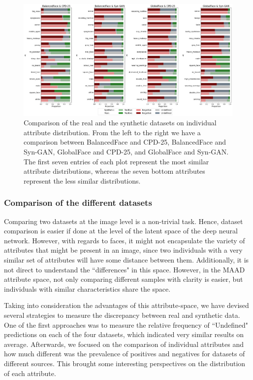\documentclass[a4paper, 10pt, conference]{ieeeconf}      %
\begin{document}
\begin{figure}
    \centering
    \includegraphics[width=1\linewidth]{annotations_plot.png}
    \caption{Comparison of the real and the synthetic datasets on individual attribute distribution. From the left to the right we have a comparison between BalancedFace and CPD-25, BalancedFace and Syn-GAN, GlobalFace and CPD-25, and GlobalFace and Syn-GAN. The first seven entries of each plot represent the most similar attribute distributions, whereas the seven bottom attributes represent the less similar distributions.  }
    \label{fig:attribute_dist}
\end{figure}

\subsubsection{Comparison of the different datasets}

Comparing two datasets at the image level is a non-trivial task. Hence, dataset comparison is easier if done at the level of the latent space of the deep neural network. However, with regards to faces, it might not encapsulate the variety of attributes that might be present in an image, since two individuals with a very similar set of attributes will have some distance between them. Additionally, it is not direct to understand the ``differences" in this space. However, in the MAAD attribute space, not only comparing different samples with clarity is easier, but individuals with similar characteristics share the space.

Taking into consideration the advantages of this attribute-space, we have devised several strategies to measure the discrepancy between real and synthetic data. One of the first approaches was to measure the relative frequency of ``Undefined" predictions on each of the four datasets, which indicated very similar results on average. Afterwards, we focused on the comparison of individual attributes and how much different was the prevalence of positives and negatives for datasets of different sources. This brought some interesting perspectives on the distribution of each attribute. 
\end{document}

